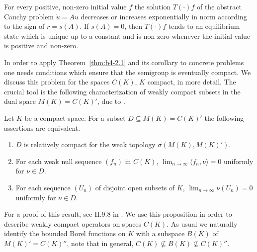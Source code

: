 For every positive, non-zero initial value $f$ the solution $T(\cdot)f$
of the abstract Cauchy problem $\dot{u} = Au$ decreases or increases
exponentially in norm according to the sign of\/ $r = s(A)$.
If\/ $s(A) = 0$, then $T(\cdot)f$ tends to an equilibrium state which is
unique up to a constant and is non-zero whenever the initial value is
positive and non-zero.

In order to apply Theorem~\ref{thm:b4-2.1} and its corollary to concrete problems one
needs conditions which ensure that the semigroup is eventually compact.
We discuss this problem for the spaces $C(K)$, $K$ compact, in
more detail.
The crucial tool is the following characterization of
weakly compact subsets in the dual space $M(K) = C(K)'$, due to
\textcite{grothendieck:1953}.
\begin{proposition}\label{prop:b4-2.3}
	Let $K$ be a compact space.
	For a subset $D \subseteq M(K) = C(K)'$ the following assertions are equivalent.
	
	\begin{enumerate}[\upshape (a)]
		\item 
		$D$ is relatively compact for the weak topology $\sigma(M(K),M(K)')$.
	
		\item 
		For each weak null sequence $(f_n)$ in $C(K)$, $\lim_{n\to\infty}\langle f_n,\nu \rangle = 0$ uniformly for $\nu \in D$.
	
		\item 
		For each sequence $(U_n)$ of disjoint open subsets of\/ $K$, 
		$\lim_{n\to\infty}\nu(U_n) = 0$ uniformly for $\nu \in D$.
		\end{enumerate}
\end{proposition}
For a proof of this result, see \eg II.9.8 in \textcite{schaefer:1974}.
We use this proposition in order to describe weakly compact operators on spaces $C(K)$.
As usual we naturally identify the bounded Borel functions on $K$ with a subspace $B(K)$ of\/ $M(K)' = C(K)''$, note that in
general, $C(K) \not\subseteq B(K) \not\subseteq C(K)''$.
